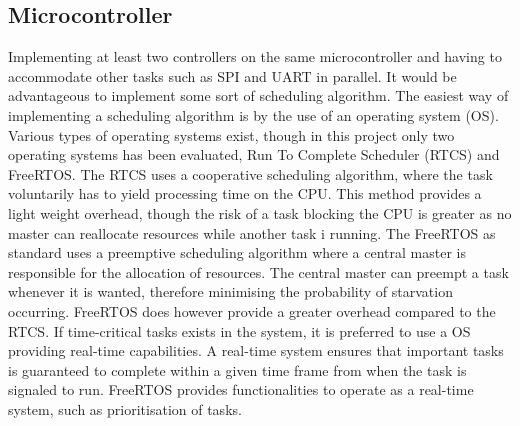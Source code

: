 \documentclass[../../main.tex]{subfiles}
\begin{document}

\subsection*{Microcontroller}
Implementing at least two controllers on the same microcontroller and having to accommodate other tasks such as SPI and UART in parallel. It would be advantageous to implement some sort of scheduling algorithm. The easiest way of implementing a scheduling algorithm is by the use of an operating system (OS). Various types of operating systems exist, though in this project only two operating systems has been evaluated, Run To Complete Scheduler (RTCS) and FreeRTOS. The RTCS uses a cooperative scheduling algorithm, where the task voluntarily has to yield processing time on the CPU. This method provides a light weight overhead, though the risk of a task blocking the CPU is greater as no master can reallocate resources while another task i running. 
The FreeRTOS as standard uses a preemptive scheduling algorithm where a central master is responsible for the allocation of resources. The central master can preempt a task whenever it is wanted, therefore minimising the probability of starvation occurring. FreeRTOS does however provide a greater overhead compared to the RTCS. If time-critical tasks exists in the system, it is preferred to use a OS providing real-time capabilities. A real-time system ensures that important tasks is guaranteed to complete within a given time frame from when the task is signaled to run. FreeRTOS provides functionalities to operate as a real-time system, such as prioritisation of tasks.   
\end{document}

